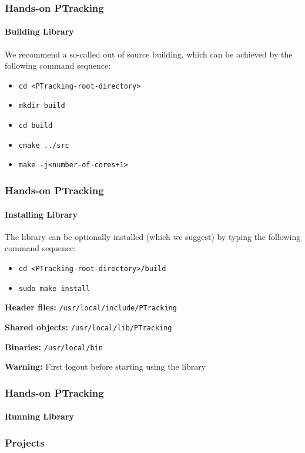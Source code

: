 \begin{frame}
	\frametitle{Hands-on PTracking}
	\framesubtitle{Building Library}
	
	\Large
	
	We recommend a so-called out of source building, which can be achieved by the following command
	sequence:
	
	\vspace{0.2cm}
	
	\begin{itemize}
		\item \texttt{cd <PTracking-root-directory>}
		\item \texttt{mkdir build}
		\item \texttt{cd build}
		\item \texttt{cmake ../src}
		\item \texttt{make -j<number-of-cores+1>}
	\end{itemize}
\end{frame}

\begin{frame}
	\frametitle{Hands-on PTracking}
	\framesubtitle{Installing Library}
	
	\Large
	
	\vspace{0.4cm}
	
	The library can be optionally installed (which we suggest) by typing the following command
	sequence:
	
	\vspace{0.2cm}
	
	\begin{itemize}
		\item \texttt{cd <PTracking-root-directory>/build}
		\item \texttt{sudo make install}
	\end{itemize}
	
	\vspace{0.3cm}
	
	\textbf{Header files:} \texttt{/usr/local/include/PTracking} \\
	
	\vspace{0.1cm}
	
	\textbf{Shared objects:} \texttt{/usr/local/lib/PTracking} \\
	
	\vspace{0.1cm}
	
	\textbf{Binaries:} \texttt{/usr/local/bin} \\
	
	\vspace{0.5cm}
	
	\textbf{Warning:} First logout before starting using the library
\end{frame}

\begin{frame}
	\frametitle{Hands-on PTracking}
	\framesubtitle{Running Library}
	
	\Large
	
	
\end{frame}

\begin{frame}
	\frametitle{Projects}
	
	\Large
	
\end{frame}
